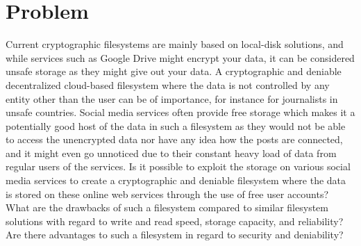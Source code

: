 
\section{Problem}
\label{sec:problem}

Current cryptographic filesystems are mainly based on \mbox{local-disk} solutions, and while services such as Google Drive might encrypt your data, it can be considered unsafe storage as they might give out your data. A cryptographic and deniable decentralized \mbox{cloud-based} filesystem where the data is not controlled by any entity other than the user can be of importance, for instance for journalists in unsafe countries. Social media services often provide free storage which makes it a potentially good host of the data in such a filesystem as they would not be able to access the unencrypted data nor have any idea how the posts are connected, and it might even go unnoticed due to their constant heavy load of data from regular users of the services. Is it possible to exploit the storage on various social media services to create a cryptographic and deniable filesystem where the data is stored on these online web services through the use of free user accounts? What are the drawbacks of such a filesystem compared to similar filesystem solutions with regard to write and read speed, storage capacity, and reliability? Are there advantages to such a filesystem in regard to security and deniability? 



